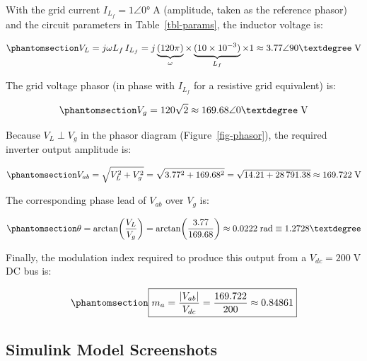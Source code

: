 \documentclass[
  letterpaper,
  DIV=11,
  numbers=noendperiod,
  oneside]{scrreprt}
\begin{document}
With the grid current \(I_{L_f} = 1\angle 0°\;\mathrm{A}\) (amplitude,
taken as the reference phasor) and the circuit parameters in
Table~\ref{tbl-params}, the inductor voltage is:

\begin{equation}\phantomsection\label{eq-vl}{
V_L = j\omega L_f \, I_{L_f}
    = j \underbrace{(120\pi)}_{\omega}
      \times \underbrace{(10 \times 10^{-3})}_{L_f}
      \times 1
    \approx 3.77\angle 90°\;\text{V}
}\end{equation}

The grid voltage phasor (in phase with \(I_{L_f}\) for a resistive grid
equivalent) is:

\begin{equation}\phantomsection\label{eq-vg}{
V_g = 120\sqrt{2} \approx 169.68\angle 0°\;\text{V}
}\end{equation}

Because \(V_L \perp V_g\) in the phasor diagram
(Figure~\ref{fig-phasor}), the required inverter output amplitude is:

\begin{equation}\phantomsection\label{eq-vab-mag}{
V_{ab} = \sqrt{V_L^2 + V_g^2}
         = \sqrt{3.77^2 + 169.68^2}
         = \sqrt{14.21 + 28\,791.38}
         \approx 169.722\;\text{V}
}\end{equation}

The corresponding phase lead of \(V_{ab}\) over \(V_g\) is:

\begin{equation}\phantomsection\label{eq-theta}{
\theta = \arctan\!\left(\frac{V_L}{V_g}\right)
       = \arctan\!\left(\frac{3.77}{169.68}\right)
       \approx 0.0222\;\text{rad}
       \equiv 1.2728°
}\end{equation}

Finally, the modulation index required to produce this output from a
\(V_{dc} = 200\;\text{V}\) DC bus is:

\begin{equation}\phantomsection\label{eq-ma}{
\boxed{m_a = \frac{|V_{ab}|}{V_{dc}}
           = \frac{169.722}{200}
           \approx 0.84861}
}\end{equation}

\subsection*{Simulink Model Screenshots}\label{sec-grid-screenshots}
\end{document}
